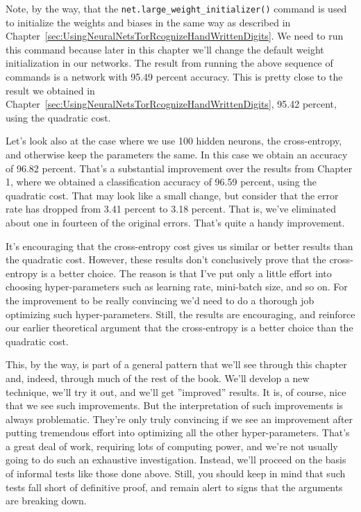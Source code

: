 Note, by the way, that the \lstinline{net.large_weight_initializer()} command is used to initialize the weights and biases in the same way as described in Chapter~\ref{sec:UsingNeuralNetsTorRcognizeHandWrittenDigits}. We need to run this command because later in this chapter we'll change the default weight initialization in our networks. The result from running the above sequence of commands is a network with 95.49 percent accuracy. This is pretty close to the result we obtained in  Chapter~\ref{sec:UsingNeuralNetsTorRcognizeHandWrittenDigits}, 95.42 percent, using the quadratic cost.


Let's look also at the case where we use 100 hidden neurons, the cross-entropy, and otherwise keep the parameters the same. In this case we obtain an accuracy of 96.82 percent. That's a substantial improvement over the results from Chapter 1, where we obtained a classification accuracy of 96.59 percent, using the quadratic cost. That may look like a small change, but consider that the error rate has dropped from 3.41 percent to 3.18
percent. That is, we've eliminated about one in fourteen of the original errors. That's quite a handy improvement.

It's encouraging that the cross-entropy cost gives us similar or better results than the quadratic cost. However, these results don't conclusively prove that the cross-entropy is a better choice. The reason is that I've put only a little effort into choosing hyper-parameters such as learning rate, mini-batch size, and so on. For the improvement to be really convincing we'd need to do a thorough job optimizing such hyper-parameters. Still, the results are encouraging, and reinforce our earlier theoretical argument that the cross-entropy is a better choice than the quadratic cost.

This, by the way, is part of a general pattern that we'll see through this chapter and, indeed, through much of the rest of the book. We'll develop a new technique, we'll try it out, and we'll get ''improved'' results. It is, of course, nice that we see such improvements. But the interpretation of such improvements is always problematic. They're only truly convincing if we see an improvement after putting tremendous effort into optimizing all the other hyper-parameters. That's a great deal of work, requiring lots of computing power, and we're not usually going to do such an exhaustive investigation. Instead, we'll proceed on the basis of informal tests like those done above. Still, you should keep in mind that such tests fall short of definitive proof, and remain alert to signs that the arguments are breaking down.

